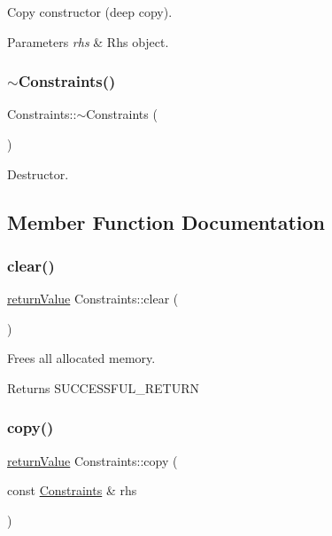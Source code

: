 Copy constructor (deep copy). 
\begin{DoxyParams}{Parameters}
{\em rhs} & Rhs object. \\
\hline
\end{DoxyParams}
\mbox{\label{class_constraints_a61f155a69191e07c32a4a1e9e60067e9}} 
\subsubsection{\texorpdfstring{$\sim$\+Constraints()}{~Constraints()}}
{\footnotesize\ttfamily Constraints\+::$\sim$\+Constraints (\begin{DoxyParamCaption}{ }\end{DoxyParamCaption})\hspace{0.3cm}{\ttfamily [virtual]}}

Destructor. 

\subsection{Member Function Documentation}
\mbox{\label{class_constraints_a945b4c8e40f28c3a2a56c8aabe3a6d5d}} 
\subsubsection{\texorpdfstring{clear()}{clear()}}
{\footnotesize\ttfamily \hyperlink{_message_handling_8hpp_a81d556f613bfbabd0b1f9488c0fa865e}{return\+Value} Constraints\+::clear (\begin{DoxyParamCaption}{ }\end{DoxyParamCaption})\hspace{0.3cm}{\ttfamily [protected]}}

Frees all allocated memory. \begin{DoxyReturn}{Returns}
S\+U\+C\+C\+E\+S\+S\+F\+U\+L\+\_\+\+R\+E\+T\+U\+RN 
\end{DoxyReturn}
\mbox{\label{class_constraints_aecbc863137db2de818bbd8c365027d2b}} 
\subsubsection{\texorpdfstring{copy()}{copy()}}
{\footnotesize\ttfamily \hyperlink{_message_handling_8hpp_a81d556f613bfbabd0b1f9488c0fa865e}{return\+Value} Constraints\+::copy (\begin{DoxyParamCaption}\item[{const \hyperlink{class_constraints}{Constraints} \&}]{rhs }\end{DoxyParamCaption})\hspace{0.3cm}{\ttfamily [protected]}}

